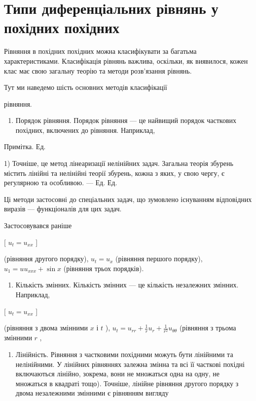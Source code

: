 \documentclass[
]{article}
\providecommand{\tightlist}{%
  \setlength{\itemsep}{0pt}\setlength{\parskip}{0pt}}
\begin{document}
\section{Типи диференціальних рівнянь у похідних
похідних}\label{ux442ux438ux43fux438-ux434ux438ux444ux435ux440ux435ux43dux446ux456ux430ux43bux44cux43dux438ux445-ux440ux456ux432ux43dux44fux43dux44c-ux443-ux43fux43eux445ux456ux434ux43dux438ux445-ux43fux43eux445ux456ux434ux43dux438ux445}

Рівняння в похідних похідних можна класифікувати за багатьма
характеристиками. Класифікація рівнянь важлива, оскільки, як виявилося,
кожен клас має свою загальну теорію та методи розв'язання рівнянь.

Тут ми наведемо шість основних методів класифікації

рівняння.

\begin{enumerate}
\def\labelenumi{\arabic{enumi}.}
\tightlist
\item
  Порядок рівняння. Порядок рівняння --- це найвищий порядок часткових
  похідних, включених до рівняння. Наприклад,
\end{enumerate}

Примітка. Ед.

1) Точніше, це метод лінеаризації нелінійних задач. Загальна теорія
збурень містить лінійні та нелінійні теорії збурень, кожна з яких, у
свою чергу, є регулярною та особливою. --- Ед. Ед.

Ці методи застосовні до спеціальних задач, що зумовлено існуванням
відповідних виразів --- функціоналів для цих задач.

Застосовувався раніше

{[} \(u_t = u_{xx}\) {]}

(рівняння другого порядку), \(u_t = u_x\) (рівняння першого порядку),
\(u_1 = uu_{xxx} + \sin x\) (рівняння трьох порядків).

\begin{enumerate}
\def\labelenumi{\arabic{enumi}.}
\setcounter{enumi}{1}
\tightlist
\item
  Кількість змінних. Кількість змінних --- це кількість незалежних
  змінних. Наприклад,
\end{enumerate}

{[} \(u_t = u_{xx}\) {]}

(рівняння з двома змінними \(x\) і \(t\) ),
\(u_t = u_{rr} + \frac{1}{r} u_r + \frac{1}{r^2} u_{\theta\theta}\)
(рівняння з трьома змінними \(r\) ,

\begin{enumerate}
\def\labelenumi{\arabic{enumi}.}
\setcounter{enumi}{2}
\tightlist
\item
  Лінійність. Рівняння з частковими похідними можуть бути лінійними та
  нелінійними. У лінійних рівняннях залежна змінна та всі її часткові
  похідні включаються лінійно, зокрема, вони не множаться одна на одну,
  не множаться в квадраті тощо). Точніше, лінійне рівняння другого
  порядку з двома незалежними змінними є рівнянням вигляду
\end{enumerate}
\end{document}
